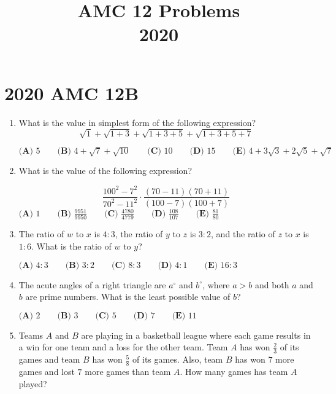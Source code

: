 \documentclass{article}
\title{AMC 12 Problems \\ 2020}
\date{}
\begin{document}
\maketitle\thispagestyle{fancy}\newpage\section*{2020 AMC 12B}
\begin{enumerate}[label=\arabic*., itemsep=0.5em]
\item What is the value in simplest form of the following expression?
\begin{equation*}
\sqrt{1} + \sqrt{1+3} + \sqrt{1+3+5} + \sqrt{1+3+5+7}
\end{equation*}


\(\textbf{(A) }5 \qquad \textbf{(B) }4 + \sqrt{7} + \sqrt{10} \qquad \textbf{(C) } 10 \qquad \textbf{(D) } 15 \qquad \textbf{(E) } 4 + 3\sqrt{3} + 2\sqrt{5} + \sqrt{7}\)\par \vspace{0.5em}\item What is the value of the following expression?

\begin{equation*}
\frac{100^2-7^2}{70^2-11^2} \cdot \frac{(70-11)(70+11)}{(100-7)(100+7)}
\end{equation*}
\(\textbf{(A) } 1 \qquad \textbf{(B) } \frac{9951}{9950} \qquad \textbf{(C) } \frac{4780}{4779} \qquad \textbf{(D) } \frac{108}{107} \qquad \textbf{(E) } \frac{81}{80} \)\par \vspace{0.5em}\item The ratio of \(w\) to \(x\) is \(4 : 3\), the ratio of \(y\) to \(z\) is \(3 : 2\), and the ratio of \(z\) to \(x\) is \(1 : 6\). What is the ratio of \(w\) to \(y\)?

\(\textbf{(A) }4:3 \qquad \textbf{(B) }3:2 \qquad \textbf{(C) } 8:3 \qquad \textbf{(D) } 4:1 \qquad \textbf{(E) } 16:3 \)\par \vspace{0.5em}\item The acute angles of a right triangle are \(a^{\circ}\) and \(b^{\circ}\), where \(a>b\) and both \(a\) and \(b\) are prime numbers. What is the least possible value of \(b\)?

\(\textbf{(A) }2\qquad\textbf{(B) }3\qquad\textbf{(C) }5\qquad\textbf{(D) }7\qquad\textbf{(E) }11\)\par \vspace{0.5em}\item Teams \(A\) and \(B\) are playing in a basketball league where each game results in a win for one team and a loss for the other team. Team \(A\) has won \(\tfrac{2}{3}\) of its games and team \(B\) has won \(\tfrac{5}{8}\) of its games. Also, team \(B\) has won \(7\) more games and lost \(7\) more games than team \(A.\) How many games has team \(A\) played?


\end{enumerate}
\end{document}
